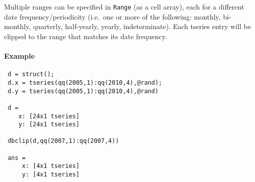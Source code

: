 Multiple ranges can be specified in \texttt{Range} (as a cell array),
 each for a different date frequency/periodicity (i.e.~one or more of the
 following: monthly, bi-monthly, quarterly, half-yearly, yearly,
 indeterminate). Each tseries entry will be clipped to the range that
 matches its date frequency.
 
 \paragraph{Example}
 
 \begin{verbatim}
 d = struct();
 d.x = tseries(qq(2005,1):qq(2010,4),@rand);
 d.y = tseries(qq(2005,1):qq(2010,4),@rand)
 
 d =
    x: [24x1 tseries]
    y: [24x1 tseries]
 
 dbclip(d,qq(2007,1):qq(2007,4))
 
 ans =
     x: [4x1 tseries]
     y: [4x1 tseries]
 \end{verbatim}


